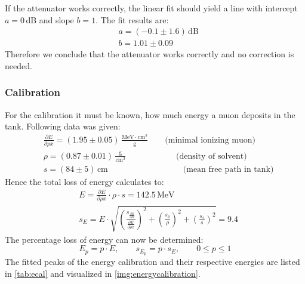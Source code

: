 If the attenuator works correctly, the linear fit should yield a line with intercept $a=0$\,dB and slope $b=1$. The fit results are:
\begin{equation}
    \begin{split}
        & a = (-0.1 \pm 1.6)\,\text{dB} \\
        & b = 1.01  \pm 0.09 
    \end{split}
\end{equation}
Therefore we conclude that the attenuator works correctly and no correction is needed.

\subsubsection{Calibration}
For the calibration it must be known, how much energy a muon deposits in the tank. Following data was given:
\begin{equation}
    \begin{split}
        & \frac{\partial E}{\partial \rho x} = (1.95 \pm 0.05)\,\frac{\text{MeV}\cdot\text{cm}^2}{\text{g}} \qquad \text{(minimal ionizing muon)}  \\
        & \rho = (0.87 \pm 0.01) \, \frac{\text{g}}{\text{cm}^3}  \qquad \qquad \qquad \text{(density of solvent)} \\
        & s = (84 \pm 5) \, \text{cm} \qquad \qquad \qquad \qquad \quad  \text{(mean free path in tank)}
    \end{split}
\end{equation}
Hence the total loss of energy calculates to:
\begin{equation}
    \begin{split}
        & E = \frac{\partial E}{\partial \rho x} \cdot \rho \cdot s = 142.5\,\text{MeV} \\
        & s_{E} = E \cdot \sqrt{ \left( \frac{s_{\frac{\partial E}{\partial \rho x}}}{\frac{\partial E}{\partial \rho x}} \right)^2 + \left( \frac{s_\rho}{\rho} \right)^2 + \left( \frac{s_s}{s} \right)^2  }
        = 9.4
    \end{split}
\end{equation}
The percentage loss of energy can now be determined:
\begin{equation}
    E_p = p \cdot E, \qquad s_{E_p} = p \cdot s_E, \qquad 0 \leq p \leq 1  %
\end{equation}
The fitted peaks of the energy calibration and their respective energies are listed in \autoref{tab:ecal} and visualized in \autoref{img:energycalibration}.
